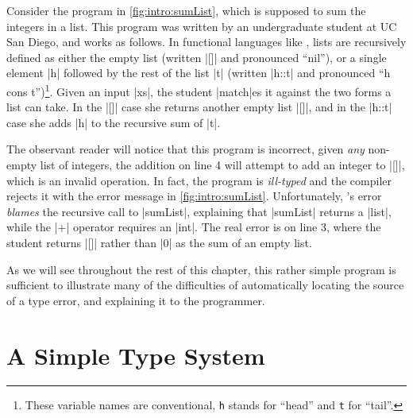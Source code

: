 Consider the \ocaml program in \autoref{fig:intro:sumList}, which is
supposed to sum the integers in a list.
%
This program was written by an undergraduate student at UC San Diego,
and works as follows.
%
In functional languages like \ocaml, lists are recursively defined as
either the empty list (written |[]| and pronounced ``nil''), or a single
element |h| followed by the rest of the list |t| (written |h::t| and
pronounced ``h cons t'')\footnote{These variable names are conventional,
  \texttt{h} stands for ``head'' and \texttt{t} for ``tail''.}.
%
Given an input |xs|, the student |match|es it against the
two forms a list can take.
%
In the |[]| case she returns another empty list |[]|, and in the
|h::t| case she adds |h| to the recursive sum of |t|.

The observant reader will notice that this program is incorrect, given
\emph{any} non-empty list of integers, the addition on line 4 will
attempt to add an integer to |[]|, which is an invalid operation.
%
In fact, the program is \emph{ill-typed} and the \ocaml compiler rejects
it with the error message in \autoref{fig:intro:sumList}.
%
Unfortunately, \ocaml's error \emph{blames} the recursive call to
|sumList|, explaining that |sumList| returns a |list|, while the |+|
operator requires an |int|.
%
The real error is on line 3, where the student returns |[]| rather than
|0| as the sum of an empty list.

As we will see throughout the rest of this chapter, this rather simple
program is sufficient to illustrate many of the difficulties of
automatically locating the source of a type error, and explaining it to
the programmer.

\section{A Simple Type System}
\label{sec:intro:simple-type}

